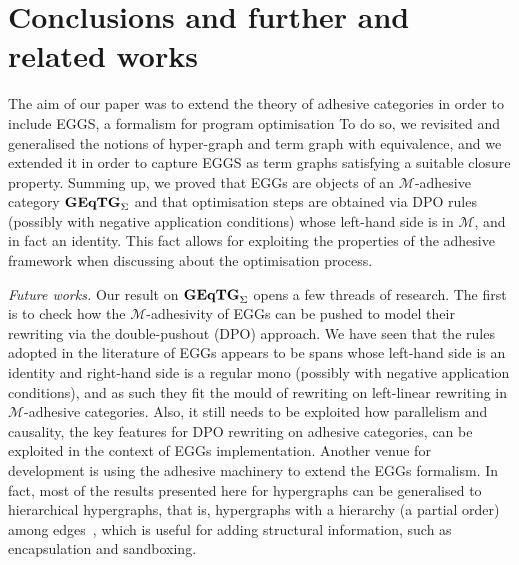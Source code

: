 \documentclass[a4paper,UKenglish,cleveref,pdftex,thm-restate,numberwithinsect]{lipics-v2021}
\newcommand{\catname}[1]{\textbf{\textup{#1}}}
\newcommand{\GEqTGs}{\catname{GEqTG}_{\Sigma}}
\begin{document}
\section{Conclusions and further and related works}
\label{conclusioni}
The aim of our paper was to extend the theory of adhesive categories in order to include EGGS, 
a formalism for program optimisation 
%
To do so, we revisited and generalised the notions of hyper-graph and term graph with equivalence, and
we extended it in order to capture EGGS as term graphs satisfying a suitable closure property.
Summing up, we proved that EGGs are objects of an $\mathcal{M}$-adhesive category $\GEqTGs$ 
and that optimisation steps are obtained via DPO rules (possibly with negative application conditions) whose 
left-hand side is in $\mathcal{M}$, and in fact an identity. 
This fact allows for exploiting the properties 
of the adhesive framework when discussing about the optimisation process.

\emph{Future works.}
Our result on $\GEqTGs$ opens a few threads of research. The first is to check how the $\mathcal{M}$-adhesivity 
of EGGs can be pushed to model their rewriting via the double-pushout (DPO) approach. We have seen that 
the rules adopted in the literature of EGGs appears to be spans whose left-hand side is an identity and 
right-hand side is a regular mono (possibly with negative application 
conditions), and as such they fit the mould of rewriting on left-linear rewriting in $\mathcal{M}$-adhesive categories. 
%
Also, it still needs to be exploited how parallelism and causality, the key features for DPO rewriting
on adhesive categories, can be exploited in the context of EGGs implementation. 
Another venue for development is using the adhesive 
machinery to extend the EGGs formalism. In fact, most of the results
presented here for hypergraphs can be generalised to hierarchical hypergraphs, that is, 
hypergraphs with a hierarchy (a partial order) among 
edges~\cite{ghicaZan,CastelnovoGM24}, which is useful for adding structural information, such as encapsulation and sandboxing.
\end{document}
